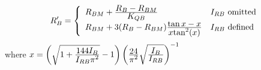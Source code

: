 \begin{equation}
R'_B = \left\{ \begin{array}{ll}
         R_{BM} + {{\textstyle R_B - R_{BM}} \over { \textstyle K_{QB}}}
         & I_{RB} \mbox{ omitted}\\
         R_{BM} + 3(R_B-R_{BM}) {{\textstyle \tan{x} - x} \over
         { \textstyle x\mbox{tan}^2(x)}}
         & I_{RB} \mbox{ defined}
     \end{array} \right. %
\end{equation}
where $x = {\left( {\textstyle \sqrt{1 + {{\textstyle 144
I_B}\over{\textstyle I_{RB}\pi^2}}}
    -1 } \right)
    \left( {\textstyle {{\textstyle 24}\over{\textstyle\pi^2}}
    \sqrt{{{\textstyle I_B}\over{\textstyle I_{RB}}}}} \right)^{-1} }$\inlineeq

